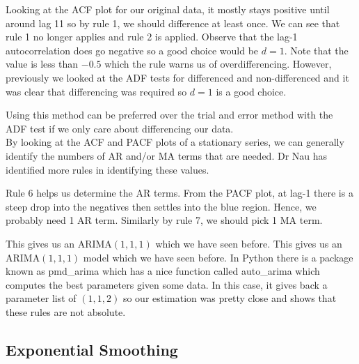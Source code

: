 \documentclass{article}
\begin{document}
  Looking at the ACF plot for our original data, it mostly stays positive until around lag 11 so by rule 1, we should difference at least once. We can see that rule 1 no longer applies and rule 2 is applied. Observe that the lag-1 autocorrelation does go negative so a good choice would be $d=1$. Note that the value is less than $-0.5$ which the rule warns us of overdifferencing. However, previously we looked at the ADF tests for differenced and non-differenced and it was clear that differencing was required so $d=1$ is a good choice.

  Using this method can be preferred over the trial and error method with the ADF test if we only care about differencing our data.\\
  By looking at the ACF and PACF plots of a stationary series, we can generally identify the numbers of AR and/or MA terms that are needed. Dr Nau has identified more rules in identifying these values.
  \newline
  \newline
  \emph{\\
  }
  \newline

  Rule 6 helps us determine the AR terms. From the PACF plot, at lag-1 there is a steep drop into the negatives then settles into the blue region. Hence, we probably need 1 AR term. Similarly by rule 7, we should pick 1 MA term.

  This gives us an ARIMA$(1,1,1)$ which we have seen before. This gives us an ARIMA$(1,1,1)$ model which we have seen before. In Python there is a package known as pmd\_arima which has a nice function called auto\_arima which computes the best parameters given some data. In this case, it gives back a parameter list of $(1,1,2)$ so our estimation was pretty close and shows that these rules are not absolute.
  
  \subsection{Exponential Smoothing}
  
\end{document}
